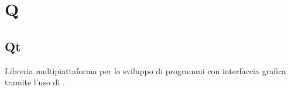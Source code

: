 \section*{Q}
\markright{}
\subsection*{Qt}
Libreria multipiattaforma per lo sviluppo di programmi con interfaccia grafica tramite l'uso di .